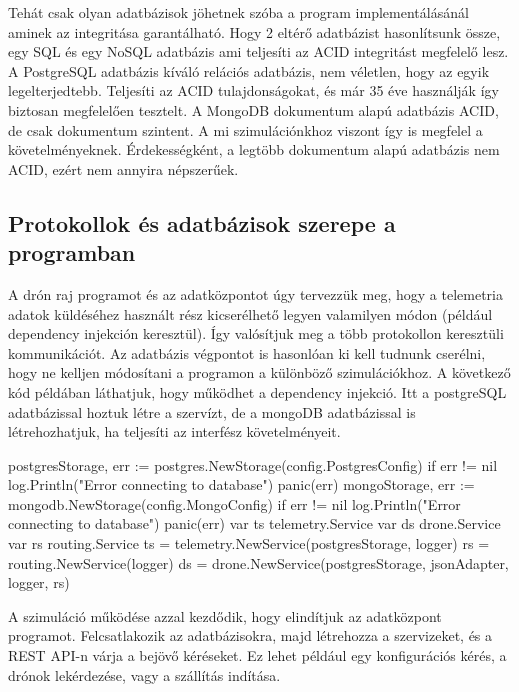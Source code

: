Tehát csak olyan adatbázisok jöhetnek szóba a program implementálásánál aminek az integritása garantálható.
Hogy 2 eltérő adatbázist hasonlítsunk össze, egy SQL és egy NoSQL adatbázis ami teljesíti az ACID integritást megfelelő lesz.
A PostgreSQL adatbázis kíváló relációs adatbázis, nem véletlen, hogy az egyik legelterjedtebb. Teljesíti az ACID tulajdonságokat, és már 35 éve használják így biztosan megfelelően tesztelt.
A MongoDB dokumentum alapú adatbázis ACID, de csak dokumentum szintent. A mi szimulációnkhoz viszont így is megfelel a követelményeknek.
Érdekességként, a legtöbb dokumentum alapú adatbázis nem ACID, ezért nem annyira népszerűek.

\subsection{Protokollok és adatbázisok szerepe a programban}
A drón raj programot és az adatközpontot úgy tervezzük meg, hogy a telemetria adatok küldéséhez használt rész kicserélhető legyen valamilyen módon (például dependency injekción keresztül).
Így valósítjuk meg a több protokollon keresztüli kommunikációt. Az adatbázis végpontot is hasonlóan ki kell tudnunk cserélni, hogy ne kelljen módosítani a programon a különböző szimulációkhoz.
A következő kód példában láthatjuk, hogy működhet a dependency injekció. Itt a postgreSQL adatbázissal hoztuk létre a szervízt, de a mongoDB adatbázissal is létrehozhatjuk, ha teljesíti az interfész követelményeit.
\begin{python}
    postgresStorage, err := postgres.NewStorage(config.PostgresConfig)
    if err != nil {
        log.Println("Error connecting to database")
        panic(err)
    }
    mongoStorage, err := mongodb.NewStorage(config.MongoConfig)
    if err != nil {
        log.Println("Error connecting to database")
        panic(err)
    }
    var ts telemetry.Service
    var ds drone.Service
    var rs routing.Service
    ts = telemetry.NewService(postgresStorage, logger)
    rs = routing.NewService(logger)
    ds = drone.NewService(postgresStorage, jsonAdapter, logger, rs)
\end{python}


A szimuláció működése azzal kezdődik, hogy elindítjuk az adatközpont programot.
Felcsatlakozik az adatbázisokra, majd létrehozza a szervizeket, és a REST API-n várja a bejövő kéréseket.
Ez lehet például egy konfigurációs kérés, a drónok lekérdezése, vagy a szállítás indítása.

